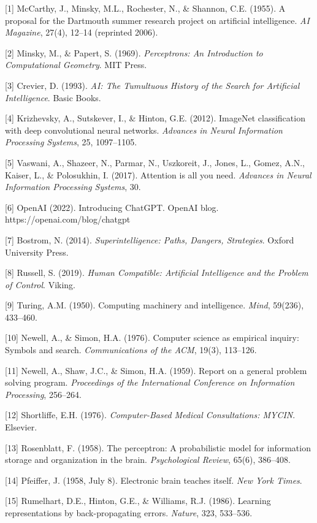 \documentclass[12pt]{article}
\begin{document}
{[}1{]} McCarthy, J., Minsky, M.L., Rochester, N., \& Shannon, C.E.
(1955). A proposal for the Dartmouth summer research project on
artificial intelligence. \emph{AI Magazine}, 27(4), 12--14 (reprinted
2006).

{[}2{]} Minsky, M., \& Papert, S. (1969). \emph{Perceptrons: An
Introduction to Computational Geometry}. MIT Press.

{[}3{]} Crevier, D. (1993). \emph{AI: The Tumultuous History of the
Search for Artificial Intelligence}. Basic Books.

{[}4{]} Krizhevsky, A., Sutskever, I., \& Hinton, G.E. (2012). ImageNet
classification with deep convolutional neural networks. \emph{Advances
in Neural Information Processing Systems}, 25, 1097--1105.

{[}5{]} Vaswani, A., Shazeer, N., Parmar, N., Uszkoreit, J., Jones, L.,
Gomez, A.N., Kaiser, L., \& Polosukhin, I. (2017). Attention is all you
need. \emph{Advances in Neural Information Processing Systems}, 30.

{[}6{]} OpenAI (2022). Introducing ChatGPT. OpenAI blog.
https://openai.com/blog/chatgpt

{[}7{]} Bostrom, N. (2014). \emph{Superintelligence: Paths, Dangers,
Strategies}. Oxford University Press.

{[}8{]} Russell, S. (2019). \emph{Human Compatible: Artificial
Intelligence and the Problem of Control}. Viking.

{[}9{]} Turing, A.M. (1950). Computing machinery and intelligence.
\emph{Mind}, 59(236), 433--460.

{[}10{]} Newell, A., \& Simon, H.A. (1976). Computer science as
empirical inquiry: Symbols and search. \emph{Communications of the ACM},
19(3), 113--126.

{[}11{]} Newell, A., Shaw, J.C., \& Simon, H.A. (1959). Report on a
general problem solving program. \emph{Proceedings of the International
Conference on Information Processing}, 256--264.

{[}12{]} Shortliffe, E.H. (1976). \emph{Computer-Based Medical
Consultations: MYCIN}. Elsevier.

{[}13{]} Rosenblatt, F. (1958). The perceptron: A probabilistic model
for information storage and organization in the brain.
\emph{Psychological Review}, 65(6), 386--408.

{[}14{]} Pfeiffer, J. (1958, July 8). Electronic brain teaches itself.
\emph{New York Times}.

{[}15{]} Rumelhart, D.E., Hinton, G.E., \& Williams, R.J. (1986).
Learning representations by back-propagating errors. \emph{Nature}, 323,
533--536.
\end{document}
